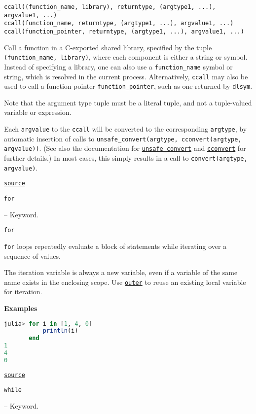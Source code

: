 \begin{adjustwidth}{2em}{0pt}


\begin{lstlisting}[]
ccall((function_name, library), returntype, (argtype1, ...), argvalue1, ...)
ccall(function_name, returntype, (argtype1, ...), argvalue1, ...)
ccall(function_pointer, returntype, (argtype1, ...), argvalue1, ...)
\end{lstlisting}

Call a function in a C-exported shared library, specified by the tuple \texttt{(function\_name, library)}, where each component is either a string or symbol. Instead of specifying a library, one can also use a \texttt{function\_name} symbol or string, which is resolved in the current process. Alternatively, \texttt{ccall} may also be used to call a function pointer \texttt{function\_pointer}, such as one returned by \texttt{dlsym}.

Note that the argument type tuple must be a literal tuple, and not a tuple-valued variable or expression.

Each \texttt{argvalue} to the \texttt{ccall} will be converted to the corresponding \texttt{argtype}, by automatic insertion of calls to \texttt{unsafe\_convert(argtype, cconvert(argtype, argvalue))}. (See also the documentation for \href{@ref Base.unsafe\_convert}{\texttt{unsafe\_convert}} and \href{@ref Base.cconvert}{\texttt{cconvert}} for further details.) In most cases, this simply results in a call to \texttt{convert(argtype, argvalue)}.



\href{https://github.com/JuliaLang/julia/blob/8e630552924eac54c809aa7bc30871c7df1582d3/base/docs/basedocs.jl#L1219-L1237}{\texttt{source}}


\end{adjustwidth}
\hypertarget{12962926564300866742}{\texttt{for}}  -- {Keyword.}

\begin{adjustwidth}{2em}{0pt}


\begin{lstlisting}[]
for
\end{lstlisting}

\texttt{for} loops repeatedly evaluate a block of statements while iterating over a sequence of values.

The iteration variable is always a new variable, even if a variable of the same name exists in the enclosing scope. Use \href{@ref}{\texttt{outer}} to reuse an existing local variable for iteration.

\textbf{Examples}


\begin{lstlisting}[language=julia, style=jlcodestyle]
julia> for i in [1, 4, 0]
           println(i)
       end
1
4
0
\end{lstlisting}



\href{https://github.com/JuliaLang/julia/blob/8e630552924eac54c809aa7bc30871c7df1582d3/base/docs/basedocs.jl#L906-L925}{\texttt{source}}


\end{adjustwidth}
\hypertarget{4254378774946180703}{\texttt{while}}  -- {Keyword.}

